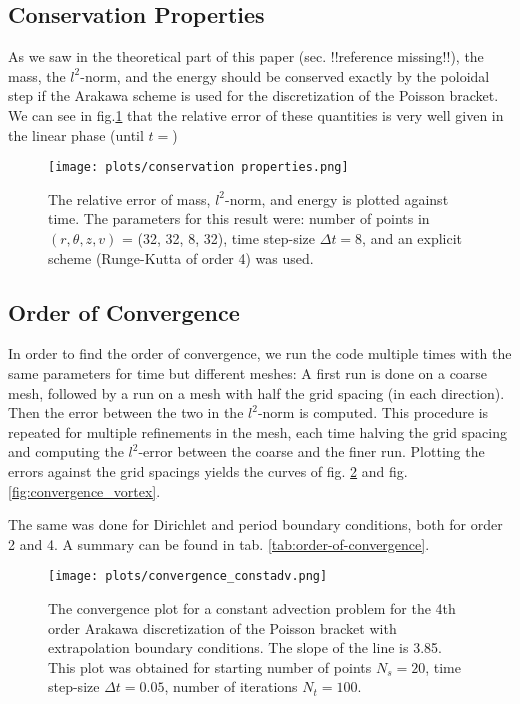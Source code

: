 \subsection{Conservation Properties}

As we saw in the theoretical part of this paper (sec. !!reference missing!!), the mass, the $l^2$-norm, and the energy should be conserved exactly by the poloidal step if the Arakawa scheme is used for the discretization of the Poisson bracket. We can see in fig.\ref{fig:conservation-properties} that the relative error of these quantities is very well given in the linear phase (until $t=$)

\begin{figure}
    \centering
    \texttt{[image: plots/conservation properties.png]}
    \caption{The relative error of mass, $l^2$-norm, and energy is plotted against time. The parameters for this result were: number of points in $(r, \theta, z, v)$ = (32, 32, 8, 32), time step-size $\Delta t = 8$, and an explicit scheme (Runge-Kutta of order 4) was used.}
    \label{fig:conservation-properties}
\end{figure}

\subsection{Order of Convergence}

In order to find the order of convergence, we run the code multiple times with the same parameters for time but different meshes: A first run is done on a coarse mesh, followed by a run on a mesh with half the grid spacing (in each direction). Then the error between the two in the $l^2$-norm is computed. This procedure is repeated for multiple refinements in the mesh, each time halving the grid spacing and computing the $l^2$-error between the coarse and the finer run. Plotting the errors against the grid spacings yields the curves of fig. \ref{fig:convergence_constadv} and fig. \ref{fig:convergence_vortex}.

The same was done for Dirichlet and period boundary conditions, both for order 2 and 4. A summary can be found in tab. \ref{tab:order-of-convergence}.

\begin{figure}[h]
    \centering
    \texttt{[image: plots/convergence\_constadv.png]}
    \caption{The convergence plot for a constant advection problem for the 4th order Arakawa discretization of the Poisson bracket with extrapolation boundary conditions. The slope of the line is 3.85. This plot was obtained for starting number of points $N_s=20$, time step-size $\Delta t = 0.05$, number of iterations $N_t = 100$.}
    \label{fig:convergence_constadv}
\end{figure}

